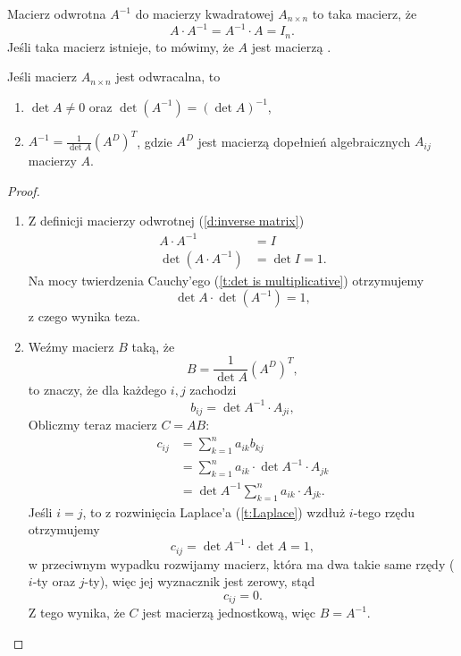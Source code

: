 \begin{definition}
    \label{d:inverse matrix}
    Macierz odwrotna $A^{-1}$ do macierzy kwadratowej $A_{n\times n}$ to taka macierz, że
    \[ A\cdot A^{-1} = A^{-1}\cdot A = I_n. \]
    Jeśli taka macierz istnieje, to mówimy, że $A$ jest macierzą .
\end{definition}

\begin{theorem}
    \label{t:invertible matrix}
    Jeśli macierz $A_{n\times n}$ jest odwracalna, to
    \begin{enumerate}
        \item $\det A \neq 0$ oraz $\det (A^{-1}) = (\det A)^{-1}$,
        \item $A^{-1} = \frac{1}{\det A} (A^D)^T$, gdzie $A^D$ jest macierzą dopełnień algebraicznych $A_{ij}$ macierzy $A$.
    \end{enumerate}
\end{theorem}
\begin{proof}
    \begin{enumerate}
        \item Z definicji macierzy odwrotnej (\ref{d:inverse matrix})
            \[ \begin{aligned} A\cdot A^{-1} &= I \\
                         \det(A\cdot A^{-1}) &= \det I = 1.
            \end{aligned} \]
            Na mocy twierdzenia Cauchy'ego (\ref{t:det is multiplicative}) otrzymujemy
            \[ \det A \cdot \det (A^{-1}) = 1, \]
            z czego wynika teza.
        \item Weźmy macierz $B$ taką, że
            \[ B = \frac{1}{\det A} (A^D)^T, \]
            to znaczy, że dla każdego $i,j$ zachodzi
            \[ b_{ij} = \det A^{-1} \cdot A_{ji}, \]
            Obliczmy teraz macierz $C = AB$:
            \[ \begin{aligned}
                c_{ij} &= \sum_{k=1}^n a_{ik} b_{kj} \\
                       &= \sum_{k=1}^n a_{ik}\cdot\det A^{-1}\cdot A_{jk} \\
                       &= \det A^{-1}\sum_{k=1}^n a_{ik}\cdot A_{jk}.
            \end{aligned} \]
            Jeśli $i = j$, to z rozwinięcia Laplace'a (\ref{t:Laplace}) wzdłuż $i$-tego rzędu otrzymujemy
            \[ c_{ij} = \det A^{-1} \cdot \det A = 1, \]
            w przeciwnym wypadku rozwijamy macierz, która ma dwa takie same rzędy ($i$-ty oraz $j$-ty), więc jej wyznacznik jest zerowy, stąd
            \[ c_{ij} = 0. \]
            Z tego wynika, że $C$ jest macierzą jednostkową, więc $B = A^{-1}$.
    \end{enumerate}
\end{proof}

